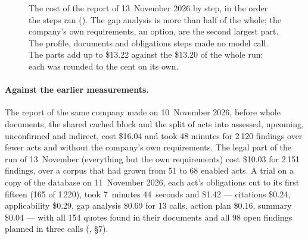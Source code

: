 \begin{figure}[H]
\centering
{}
\caption{The cost of the report of 13~November 2026 by step, in the order the steps ran
(). The gap analysis is more than half of the whole; the company's own
requirements, an option, are the second largest part. The profile, documents and obligations
steps made no model call. The parts add up to \$13.22 against the \$13.20 of the whole run: each
was rounded to the cent on its own.}\label{fig:report:cost}
\end{figure}

\paragraph{Against the earlier measurements.} The report of the same company made on
10~November 2026, before whole documents, the shared cached block and the split of acts into
assessed, upcoming, unconfirmed and indirect, cost \$16.04 and took 48 minutes for 2\,120
findings over fewer acts and without the company's own requirements. The legal part of the run
of 13~November (everything but the own requirements) cost \$10.03 for 2\,151 findings, over a
corpus that had grown from 51 to 68 enabled acts. A trial on a copy of the database on
11~November 2026, each act's obligations cut to its first fifteen (165 of 1\,220), took 7~minutes
44~seconds and \$1.42 --- citations \$0.24, applicability \$0.29, gap analysis \$0.69 for 13 calls,
action plan \$0.16, summary \$0.04 --- with all 154 quotes found in their documents and all 98
open findings planned in three calls (, §7).


